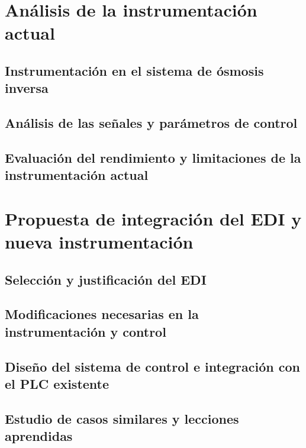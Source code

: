 \documentclass[
	spanish, %
	letterpaper, oneside
]{book}
\begin{document}
\templateIndex

\templateFinalcfg





\chapter{Análisis de la instrumentación actual}
\section{Instrumentación en el sistema de ósmosis inversa}
\section{Análisis de las señales y parámetros de control}
\section{Evaluación del rendimiento y limitaciones de la instrumentación actual}


\chapter{Propuesta de integración del EDI y nueva instrumentación}
\section{Selección y justificación del EDI}
\section{Modificaciones necesarias en la instrumentación y control}
\section{Diseño del sistema de control e integración con el PLC existente}
\section{Estudio de casos similares y lecciones aprendidas}
\end{document}

